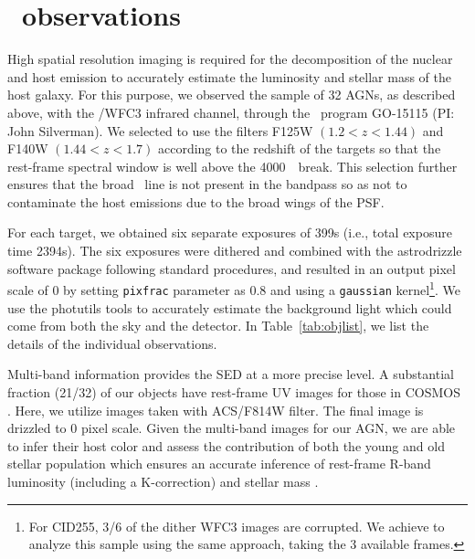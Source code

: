 \documentclass[apj]{emulateapj}
\begin{document}
\section{\hst\ observations}
\label{observation}
High spatial resolution imaging is required for the decomposition of the nuclear and host emission to accurately estimate the luminosity and stellar mass of the host galaxy. For this purpose, we observed the sample of 32 AGNs, as described above, with the \hst/WFC3 infrared channel, through the \hst\ program GO-15115 (PI: John Silverman). We selected to use the filters F125W $(1.2<z<1.44)$ and F140W $(1.44<z<1.7)$ according to the redshift of the targets so that the rest-frame spectral window is well above the 4000~\angstrom\ break. This selection further ensures that the broad \halpha\ line is not present in the bandpass so as not to contaminate the host emissions due to the broad wings of the PSF.

For each target, we obtained six separate exposures of 399s (i.e., total exposure time 2394s). The six exposures were dithered and combined with the {\sc astrodrizzle} software package following standard procedures, and resulted in an output pixel scale of 0 by setting \texttt{pixfrac} parameter as 0.8 and using a \texttt{gaussian} kernel\footnote{\label{note1}For CID255, 3/6 of the dither WFC3 images are corrupted. We achieve to analyze this sample using the same approach, taking the 3 available frames.}. We use the {\sc photutils} tools to accurately estimate the background light which could come from both the sky and the detector. In Table~\ref{tab:objlist}, we list the details of the individual observations.

Multi-band information provides the SED at a more precise level. A substantial fraction (21/32) of our objects have rest-frame UV images for those in COSMOS \citep{Koekemoer2007}. Here, we utilize images taken with ACS/F814W filter. The final image is drizzled to 0 pixel scale. Given the multi-band images for our AGN, we are able to infer their host color and assess the contribution of both the young and old stellar population which ensures an accurate inference of rest-frame R-band luminosity (including a K-correction) and stellar mass \citep{Gallazzi2009}. 
\end{document}
